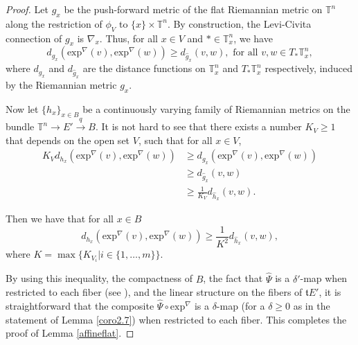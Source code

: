 \documentclass[onecolumn,notitlepage,11pt]{article}
\newcommand{\T}{\mathbb{T}}
\newcommand{\beq}{\begin{equation*}}
\newcommand{\eeq}{\end{equation*}}
\theoremstyle{definition}
\begin{document}
\begin{proof}
Let $g_x$ be the push-forward metric of the flat Riemannian metric on $\T^n$ 
along the restriction
of $\phi_V$ to $\{x\}\times\T^n$. By construction, the 
Levi-Civita 
connection of $g_x$ is $\nabla_x$. Thus, for all $x\in V$ and
$\ast\in\T^n_x$, we have
\beq
d_{g_x}(\mbox{exp}^{\nabla}(v),\mbox{exp}^{\nabla}(w))
\geq d_{\hat{g}_x}(v,w), 
\text{  for all  } v,w\in T_{\ast}\T^n_x,
\eeq
where $d_{g_x}$ and $d_{\hat{g}_x}$ are the distance functions on
$\T^n_x$ and  $T_{\ast}\T^n_x$ respectively, induced by the Riemannian metric $g_x$.

Now let $\{h_x\}_{x\in B}$ be a continuously varying family of Riemannian metrics
on the bundle $\T^n\to E'\xrightarrow{q} B$. It is not hard to see that
there exists a number $K_V\geq 1$ that depends on the open set $V$, such
that for all $x\in V$,
\begin{align}\label{ineq}
K_V d_{h_x}(\mbox{exp}^{\nabla}(v),\mbox{exp}^{\nabla}(w))\nonumber
&\geq d_{g_x}(\mbox{exp}^{\nabla}(v),\mbox{exp}^{\nabla}(w))\\
&\geq d_{\hat{g}_x}(v,w)\\
&\geq\frac{1}{K_V} d_{\hat{h}_x}(v,w)\nonumber.
\end{align}

Then we have
that for all $x\in B$
\beq
d_{h_x}(\mbox{exp}^{\nabla}(v),\mbox{exp}^{\nabla}(w))\geq\frac{1}{K^2} d_{\hat{h}_x}(v,w),
\eeq
where $K=\max\{K_{V_i}|i\in\{1,\ldots,m\}\}$.

By using this inequality, 
the compactness of $B$,
the fact that $\widehat{\Psi}$ is a $\delta'$-map when restricted to
each fiber
(see \cite[p. 409]{FW91}), and the linear structure on the fibers of
$\mathfrak{t}E'$, it is straightforward
that the composite $\widehat{\Psi}\circ\mbox{exp}^{\nabla}$
is a $\delta$-map (for a $\delta\geq 0$ as in the statement of Lemma
\ref{coro2.7}) when restricted to each fiber.
This completes the proof of Lemma \ref{affineflat}.
\end{proof}
\end{document}
